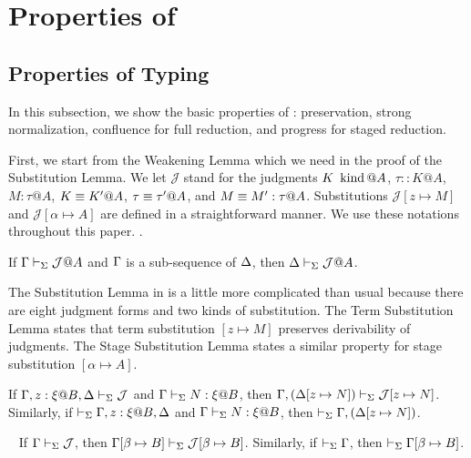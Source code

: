 
\section{Properties of \LMD \label{sec:properties}}

\subsection{Properties of Typing}

In this subsection, we show the basic properties of \LMD: preservation, strong
normalization, confluence for full reduction, and progress for staged
reduction.

First, we start from the Weakening Lemma which we need in the proof of the Substitution Lemma.
We let $\mathcal{J}$ stand for the judgments \({K \operatorname{\ kind} @A}\),
\({\tau::K@A}\), \({M:\tau@A}\), \({K \equiv K' @ A}\), \({\tau \equiv \tau' @ A}\),
and \({M \equiv M' : \tau @ A}\).  Substitutions \({\mathcal{J}[z \mapsto M]}\) and
\({\mathcal{J}[\alpha \mapsto A]}\) are defined in a straightforward manner.
We use these notations throughout this paper.
.

\begin{lemma}[Weakening]
    \label{lemma:Weakening}
    If \(\Gamma \vdash_\Sigma \mathcal{J}@A\) and \(\Gamma\) is a sub-sequence of \(\Delta\), then \(\Delta \vdash_\Sigma \mathcal{J}@A\).
\end{lemma}


The Substitution Lemma in \LMD{} is a little more complicated than usual
because there are eight judgment forms and two kinds of substitution.  The Term
Substitution Lemma states that term substitution $[z \mapsto M]$ preserves
derivability of judgments. The Stage Substitution Lemma states a similar
property for stage substitution $[\alpha\mapsto A]$.  

\begin{lemma}
    \label{lemma:TermSubstitution}
    If \({\G, z:\xi@B, \D \V \mathcal{J}}\) and \({\Gamma\vdash_\Sigma N:\xi @B}\), then \({\Gamma, (\Delta[z \mapsto N]) \vdash_\Sigma \mathcal{J}[z \mapsto N]}\).  Similarly, if \({\V \G, z:\xi@B, \D}\) and
    \( {\Gamma\vdash_\Sigma N:\xi @B} \), then ${ \vdash_\Sigma \Gamma, (\Delta[z \mapsto N]) }$.
\end{lemma}

\begin{lemma}\
    \label{lemma:StageSubstitution}
    If $\Gamma \vdash_\Sigma \mathcal{J}$, then $\Gamma[\beta\mapsto B] \vdash_\Sigma \mathcal{J}[\beta\mapsto B]$.  Similarly, if $\vdash_\Sigma \Gamma$, then $\vdash_\Sigma \Gamma[\beta\mapsto B]$.
\end{lemma}

